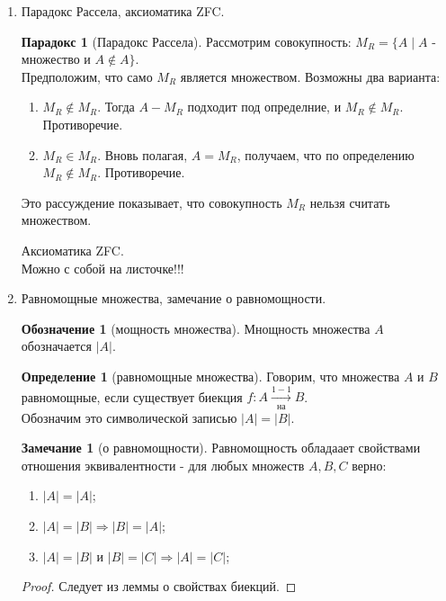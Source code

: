 \documentclass[a4paper]{article}
\theoremstyle{definition}
\newtheorem*{definition*}{Определение}
\newtheorem*{name}{Обозначение}
\newtheorem*{paradoks}{Парадокс}
\newtheorem*{comment*}{Замечание}
\begin{document}
\begin{enumerate}
 \item Парадокс Рассела, аксиоматика ZFC.
       \begin{paradoks}[Парадокс Рассела]
        Рассмотрим совокупность:
        $M_{R} = \{ A \mid  A$ - множество и $A  \notin A \}$.\\
        Предположим, что само $M_{R}$ является множеством. Возможны два варианта:\\
        \begin{enumerate}
         \item $M_{R} \notin{M_{R}}$. Тогда $A - M_{R}$ подходит под определние, и $M_{R} \notin{M_{R}}$. Противоречие.
         \item $M_{R} \in{M_{R}}$. Вновь полагая, $A = M_{R}$, получаем, что по определению $M_{R} \notin{M_{R}}$. Противоречие.
        \end{enumerate}
        Это рассуждение показывает, что совокупность $M_{R}$ нельзя считать множеством.
       \end{paradoks}
       Аксиоматика ZFC.\\
       Можно с собой на листочке!!!
 \item Равномощные множества, замечание о равномощности.
       \begin{name}[мощность множества]
        Мнощность множества $A$ обозначается $|A|$.
       \end{name}
       \begin{definition*}[равномощные множества]
        Говорим, что множества $A$ и $B$ равномощные, если существует биекция $f: A \xrightarrow[ \text{на}]{1-1} B$. \\
        Обозначим это символической записью $|A| = |B|$.
       \end{definition*}
       \begin{comment*}[о равномощности]
        Равномощность обладаает свойствами отношения эквивалентности - для любых множеств $A, B, C$ верно:
        \begin{enumerate}
         \item $|A| = |A|$;
         \item $|A| = |B| \Rightarrow |B| = |A|$;
         \item $|A| = |B|$ и $|B| = |C| \Rightarrow |A| = |C|$;
        \end{enumerate}
       \end{comment*}
       \begin{proof}
        Следует из леммы о свойствах биекций.
       \end{proof}

\end{enumerate}
\end{document}
